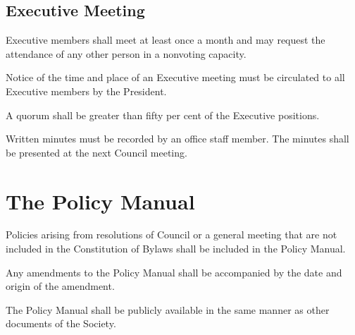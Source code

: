 \subsection{Executive Meeting}
\begin{longenum}[ label*=\thesubsection.\arabic*., align=left]
	\item Executive members shall meet at least once a month and may request the attendance of any other person in a nonvoting capacity. 

    \item Notice of the time and place of an Executive meeting must be circulated to all Executive members by the President.

    \item A quorum shall be greater than fifty per cent of the Executive positions.

    \item Written minutes must be recorded by an office staff member. The minutes shall be presented at the next Council meeting.

\end{longenum}
\newpage

\section{The Policy Manual}
\begin{longenum}[ label*=\thesection.\arabic*., align=left]
	\item Policies arising from resolutions of Council or a general meeting that are not included in the Constitution of Bylaws shall be included in the Policy Manual.
    \item Any amendments to the Policy Manual shall be accompanied by the date and origin of the amendment.
    \item The Policy Manual shall be publicly available in the same manner as other documents of the Society.
\end{longenum}
\newpage

